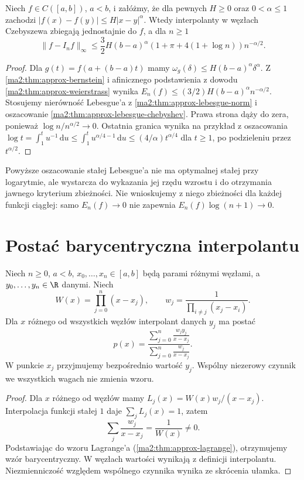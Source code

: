 \begin{wniosek}
\label{ma2:cor:approx-chebyshev-holder}
Niech $f\in C([a,b])$, $a<b$,
i załóżmy, że dla pewnych $H\ge0$
oraz $0<\alpha\le1$ zachodzi
$|f(x)-f(y)|\le H|x-y|^\alpha$.
Wtedy interpolanty w węzłach Czebyszewa
zbiegają jednostajnie do $f$, a dla $n\ge1$
\[
 \|f-I_nf\|_\infty\le
 \frac32 H(b-a)^\alpha
 (1+\pi+4(1+\log n))n^{-\alpha/2}.
\]
\end{wniosek}
\begin{proof}
Dla $g(t)=f(a+(b-a)t)$ mamy
$\omega_g(\delta)\le H(b-a)^\alpha\delta^\alpha$.
Z \ref{ma2:thm:approx-bernstein} i
afinicznego podstawienia z dowodu
\ref{ma2:thm:approx-weierstrass}
wynika
$E_n(f)\le(3/2)H(b-a)^\alpha n^{-\alpha/2}$.
Stosujemy nierówność Lebesgue'a z
\ref{ma2:thm:approx-lebesgue-norm}
i oszacowanie
\ref{ma2:thm:approx-lebesgue-chebyshev}.
Prawa strona dąży do zera, ponieważ
$\log n/n^{\alpha/2}\to0$.
Ostatnia granica wynika na przykład z oszacowania
$\log t=\int_1^t u^{-1}\,\mathrm du
\le\int_1^t u^{\alpha/4-1}\,\mathrm du
\le(4/\alpha)t^{\alpha/4}$ dla $t\ge1$,
po podzieleniu przez $t^{\alpha/2}$.
\end{proof}

Powyższe oszacowanie stałej Lebesgue'a
nie ma optymalnej stałej przy logarytmie,
ale wystarcza do wykazania jej rzędu wzrostu
i do otrzymania jawnego kryterium zbieżności.
Nie wnioskujemy z niego zbieżności
dla każdej funkcji ciągłej: samo
$E_n(f)\to0$ nie zapewnia
$E_n(f)\log(n+1)\to0$.

\section{Postać barycentryczna interpolantu}

\begin{twierdzenie}
\label{ma2:thm:approx-barycentric}
Niech $n\ge0$, $a<b$, $x_0,\ldots,x_n\in[a,b]$
będą parami różnymi węzłami, a $y_0,\ldots,y_n\in\R$
danymi. Niech
\[
 W(x)=\prod_{j=0}^n(x-x_j),\qquad
 w_j=\frac1{\prod_{i\ne j}(x_j-x_i)}.
\]
Dla $x$ różnego od wszystkich węzłów
interpolant danych $y_j$ ma postać
\[
 p(x)=\frac{\displaystyle\sum_{j=0}^n
                       \frac{w_jy_j}{x-x_j}}
                 {\displaystyle\sum_{j=0}^n
                       \frac{w_j}{x-x_j}}.
\]
W punkcie $x_j$ przyjmujemy bezpośrednio
wartość $y_j$. Wspólny niezerowy czynnik
we wszystkich wagach nie zmienia wzoru.
\end{twierdzenie}
\begin{proof}
Dla $x$ różnego od węzłów mamy
$L_j(x)=W(x)w_j/(x-x_j)$.
Interpolacja funkcji stałej $1$ daje
$\sum_jL_j(x)=1$, zatem
\[
 \sum_j\frac{w_j}{x-x_j}=\frac1{W(x)}\ne0.
\]
Podstawiając do wzoru Lagrange'a
(\ref{ma2:thm:approx-lagrange}), otrzymujemy
wzór barycentryczny. W węzłach wartości
wynikają z definicji interpolantu.
Niezmienniczość względem wspólnego
czynnika wynika ze skrócenia ułamka.
\end{proof}

